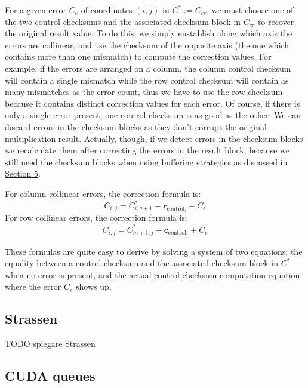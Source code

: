 For a given error $C_e$ of coordinates $(i,j)$ in $C^* := C_{cr}$, we must choose one of the two control checksums and the associated checksum block in $C_{cr}$ to recover the original result value.
To do this, we simply enstablish along which axis the errors are collinear, and use the checksum of the opposite axis (the one which contains more than one mismatch) to compute the correction values.
For example, if the errors are arranged on a column, the column control checksum will contain a single mismatch while the row control checksum will contain as many mismatches as the error count, thus we have to use the row checksum because it contains distinct correction values for each error.
Of course, if there is only a single error present, one control checksum is as good as the other.
We can discard errors in the checksum blocks
as they don't corrupt the original multiplication result.
Actually, though, if we detect errors in the checksum blocks
we recalculate them after correcting the errors in the result block,
because we still need the checksum blocks
when using buffering strategies as discussed in \hyperref[sec:strategies]{Section 5}.

For column-collinear errors, the correction formula is:
\[
  C_{i,j} = C^*_{i,q+1} - \mathbf{r}_{\text{control}_{i}} + C_e
\]
For row collinear errors, the correction formula is:
\[
  C_{i,j} = C^*_{m+1,j} - \mathbf{c}_{\text{control}_{j}} + C_e
\]

These formulas are quite easy to derive by solving a system of two equations:
the equality between a control checksum and the associated checksum block in $C^*$ when no error is present,
and the actual control checksum computation equation where the error $C_e$ shows up.

\subsection{Strassen}

TODO spiegare Strassen

\subsection{CUDA queues}

